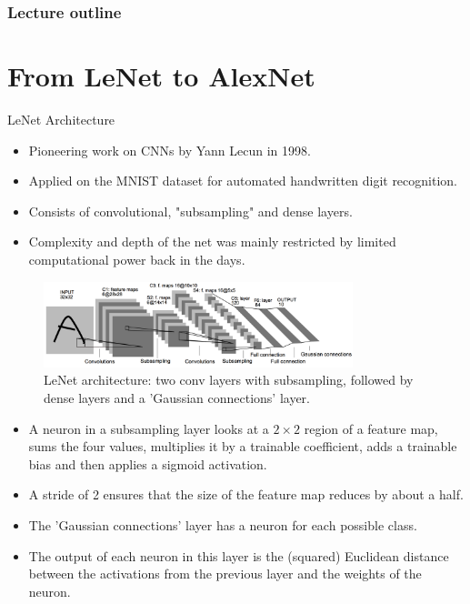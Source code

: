 








\begin{frame}
\frametitle{Lecture outline}
\tableofcontents
\end{frame}


\section{From LeNet to AlexNet}

\begin{vbframe}{LeNet Architecture}
  \begin{itemize}
    \item Pioneering work on CNNs by Yann Lecun in 1998. 
    \item Applied on the MNIST dataset for automated handwritten digit recognition.
    \item Consists of convolutional, "subsampling" and dense layers.
    \item Complexity and depth of the net was mainly restricted by limited computational power back in the days.
  \end{itemize}
  \begin{figure}
  \centering
    \includegraphics[width=9cm]{plots/architectures/lenet.png}
    \caption{LeNet architecture: two conv layers with subsampling, followed by dense layers and a 'Gaussian connections' layer.}
  \end{figure}
  \framebreak
  \begin{itemize}
    \item A neuron in a subsampling layer looks at a $2 \times 2$ region of a feature map, sums the four values, multiplies it by a trainable coefficient, adds a trainable bias and then applies a sigmoid activation.
    \item A stride of 2 ensures that the size of the feature map reduces by about a half.
    \item The 'Gaussian connections' layer has a neuron for each possible class. 
    \item The output of each neuron in this layer is the (squared) Euclidean distance between the activations from the previous layer and the weights of the neuron.
  \end{itemize}   
\end{vbframe}


